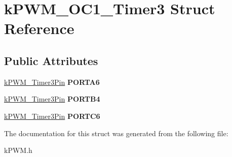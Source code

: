 \hypertarget{structkPWM__OC1__Timer3}{}\section{k\+P\+W\+M\+\_\+\+O\+C1\+\_\+\+Timer3 Struct Reference}
\label{structkPWM__OC1__Timer3}
\subsection*{Public Attributes}
\begin{DoxyCompactItemize}
\item 
\hyperlink{structkPWM__Timer3Pin}{k\+P\+W\+M\+\_\+\+Timer3\+Pin} {\bfseries P\+O\+R\+T\+A6}\hypertarget{structkPWM__OC1__Timer3_a0422a77a6ea7b0bdf27ffc0c32ace4e5}{}\label{structkPWM__OC1__Timer3_a0422a77a6ea7b0bdf27ffc0c32ace4e5}

\item 
\hyperlink{structkPWM__Timer3Pin}{k\+P\+W\+M\+\_\+\+Timer3\+Pin} {\bfseries P\+O\+R\+T\+B4}\hypertarget{structkPWM__OC1__Timer3_a6f7c43a3cf0fe26b3ae8dbb68a8ca3da}{}\label{structkPWM__OC1__Timer3_a6f7c43a3cf0fe26b3ae8dbb68a8ca3da}

\item 
\hyperlink{structkPWM__Timer3Pin}{k\+P\+W\+M\+\_\+\+Timer3\+Pin} {\bfseries P\+O\+R\+T\+C6}\hypertarget{structkPWM__OC1__Timer3_a87fe6732418111fb1b5c8097d71f60e2}{}\label{structkPWM__OC1__Timer3_a87fe6732418111fb1b5c8097d71f60e2}

\end{DoxyCompactItemize}


The documentation for this struct was generated from the following file\+:\begin{DoxyCompactItemize}
\item 
k\+P\+W\+M.\+h\end{DoxyCompactItemize}
